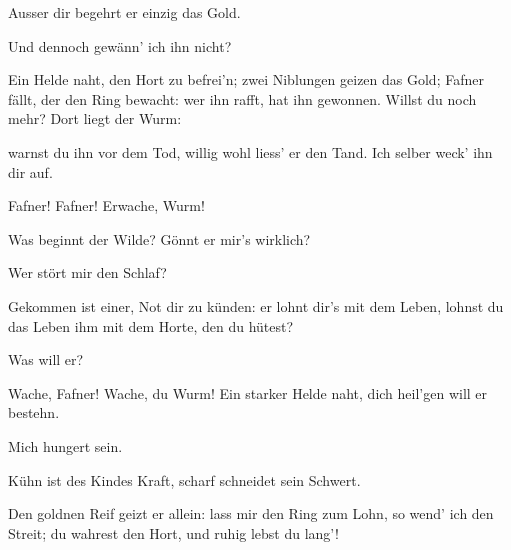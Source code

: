 \begin{drama}
\Wandererspeaks

Ausser dir begehrt er
einzig das Gold.

\Alberichspeaks

Und dennoch gewänn' ich ihn nicht?

\Wandererspeaks


Ein Helde naht,
den Hort zu befrei'n;
zwei Niblungen geizen das Gold;
Fafner fällt,
der den Ring bewacht:
wer ihn rafft, hat ihn gewonnen.
Willst du noch mehr?
Dort liegt der Wurm:


warnst du ihn vor dem Tod,
willig wohl liess' er den Tand.
Ich selber weck' ihn dir auf.


Fafner! Fafner!
Erwache, Wurm!

\Alberichspeaks


Was beginnt der Wilde?
Gönnt er mir's wirklich?


\Fafnerspeaks

Wer stört mir den Schlaf?

\Wandererspeaks


Gekommen ist einer,
Not dir zu künden:
er lohnt dir's mit dem Leben,
lohnst du das Leben ihm
mit dem Horte, den du hütest?


Was will er?

\Alberichspeaks


Wache, Fafner!
Wache, du Wurm!
Ein starker Helde naht,
dich heil'gen will er bestehn.

Mich hungert sein.

\Wandererspeaks

Kühn ist des Kindes Kraft,
scharf schneidet sein Schwert.

\Alberichspeaks

Den goldnen Reif
geizt er allein:
lass mir den Ring zum Lohn,
so wend' ich den Streit;
du wahrest den Hort,
und ruhig lebst du lang'!


\end{drama}
